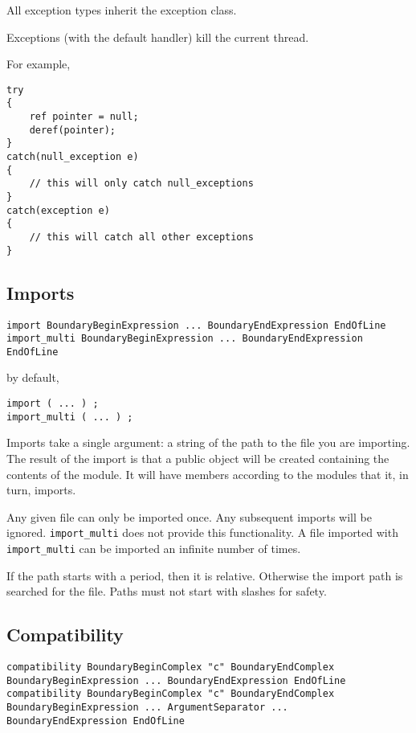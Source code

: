 \documentclass[10pt,a4paper]{article}
\begin{document}
All exception types inherit the exception class.

Exceptions (with the default handler) kill the current thread. 

For example,
\begin{verbatim}
try
{
    ref pointer = null;
    deref(pointer);
}
catch(null_exception e)
{
    // this will only catch null_exceptions
}
catch(exception e)
{
    // this will catch all other exceptions
}
\end{verbatim}

\subsection{Imports}
\label{sec:imports}
\begin{verbatim}
import BoundaryBeginExpression ... BoundaryEndExpression EndOfLine
import_multi BoundaryBeginExpression ... BoundaryEndExpression EndOfLine
\end{verbatim}

by default,
\begin{verbatim}
import ( ... ) ;
import_multi ( ... ) ;
\end{verbatim}

Imports take a single argument: a string of the path to the file you are importing. The result of the import is that a public object will be created containing the contents of the module. It will have members according to the modules that it, in turn, imports.

Any given file can only be imported once. Any subsequent imports will be ignored. \verb|import_multi| does not provide this functionality. A file imported with \verb|import_multi| can be imported an infinite number of times.

If the path starts with a period, then it is relative. Otherwise the import path is searched for the file. Paths must not start with slashes for safety.

\subsection{Compatibility}
\label{sec:compatibilityExpressions}
\begin{verbatim}
compatibility BoundaryBeginComplex "c" BoundaryEndComplex BoundaryBeginExpression ... BoundaryEndExpression EndOfLine
compatibility BoundaryBeginComplex "c" BoundaryEndComplex BoundaryBeginExpression ... ArgumentSeparator ... BoundaryEndExpression EndOfLine
\end{verbatim}
\end{document}
